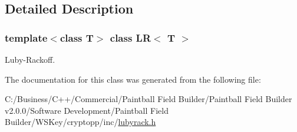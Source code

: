 \subsection{Detailed Description}
\subsubsection*{template$<$class T$>$ class LR$<$ T $>$}

Luby-\/Rackoff. 

The documentation for this class was generated from the following file:\begin{DoxyCompactItemize}
\item 
C:/Business/C++/Commercial/Paintball Field Builder/Paintball Field Builder v2.0.0/Software Development/Paintball Field Builder/WSKey/cryptopp/inc/\hyperlink{lubyrack_8h}{lubyrack.h}\end{DoxyCompactItemize}
